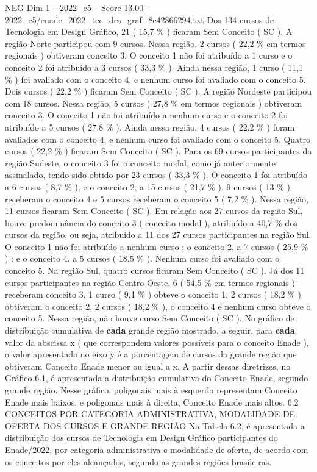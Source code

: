 \begin{textsample}{NEG Dim 1 – 2022\_c5 – Score 13.00 – 2022\_c5/enade\_2022\_tec\_des\_graf\_8c42866294.txt}
Dos 134 cursos de Tecnologia em Design Gráfico, 21 ( 15,7 \% ) ficaram Sem Conceito ( SC ).
A região Norte participou com 9 cursos.
Nessa região, 2 cursos ( 22,2 \% em termos regionais ) obtiveram conceito 3.
O conceito 1 não foi atribuído a 1 curso e o conceito 2 foi atribuído a 3 cursos ( 33,3 \% ).
Ainda nessa região, 1 curso ( 11,1 \% ) foi avaliado com o conceito 4, e nenhum curso foi avaliado com o conceito 5.
Dois cursos ( 22,2 \% ) ficaram Sem Conceito ( SC ).
A região Nordeste participou com 18 cursos.
Nessa região, 5 cursos ( 27,8 \% em termos regionais ) obtiveram conceito 3.
O conceito 1 não foi atribuído a nenhum curso e o conceito 2 foi atribuído a 5 cursos ( 27,8 \% ).
Ainda nessa região, 4 cursos ( 22,2 \% ) foram avaliados com o conceito 4, e nenhum curso foi avaliado com o conceito 5.
Quatro cursos ( 22,2 \% ) ficaram Sem Conceito ( SC ).
Para os 69 cursos participantes da região Sudeste, o conceito 3 foi o conceito modal, como já anteriormente assinalado, tendo sido obtido por 23 cursos ( 33,3 \% ).
O conceito 1 foi atribuído a 6 cursos ( 8,7 \% ), e o conceito 2, a 15 cursos ( 21,7 \% ). 9 cursos ( 13 \% ) receberam o conceito 4 e 5 cursos receberam o conceito 5 ( 7,2 \% ).
Nessa região, 11 cursos ficaram Sem Conceito ( SC ).
Em relação aos 27 cursos da região Sul, houve predominância do conceito 3 ( conceito modal ), atribuído a 40,7 \% dos cursos da região, ou seja, atribuído a 11 dos 27 cursos participantes na região Sul.
O conceito 1 não foi atribuído a nenhum curso ; o conceito 2, a 7 cursos ( 25,9 \% ) ; e o conceito 4, a 5 cursos ( 18,5 \% ).
Nenhum curso foi avaliado com o conceito 5.
Na região Sul, quatro cursos ficaram Sem Conceito ( SC ).
Já dos 11 cursos participantes na região Centro-Oeste, 6 ( 54,5 \% em termos regionais ) receberam conceito 3, 1 curso ( 9,1 \% ) obteve o conceito 1, 2 cursos ( 18,2 \% ) obtiveram o conceito 2, 2 cursos ( 18,2 \% ), o conceito 4 e nenhum curso obteve o conceito 5.
Nessa região, não houve curso Sem Conceito ( SC ).
No gráfico de distribuição cumulativa de \textbf{cada} grande região mostrado, a seguir, para \textbf{cada} valor da abscissa x ( que correspondem valores possíveis para o conceito Enade ), o valor apresentado no eixo y é a porcentagem de cursos da grande região que obtiveram Conceito Enade menor ou igual a x.
A partir dessas diretrizes, no Gráfico 6.1, é apresentada a distribuição cumulativa do Conceito Enade, segundo grande região.
Nesse gráfico, poligonais mais à esquerda representam Conceito Enade mais baixos, e poligonais mais à direita, Conceito Enade mais altos. 6.2 CONCEITOS POR CATEGORIA ADMINISTRATIVA, MODALIDADE DE OFERTA DOS CURSOS E GRANDE REGIÃO Na Tabela 6.2, é apresentada a distribuição dos cursos de Tecnologia em Design Gráfico participantes do Enade/2022, por categoria administrativa e modalidade de oferta, de acordo com os conceitos por eles alcançados, segundo as grandes regiões brasileiras.

\end{textsample}
